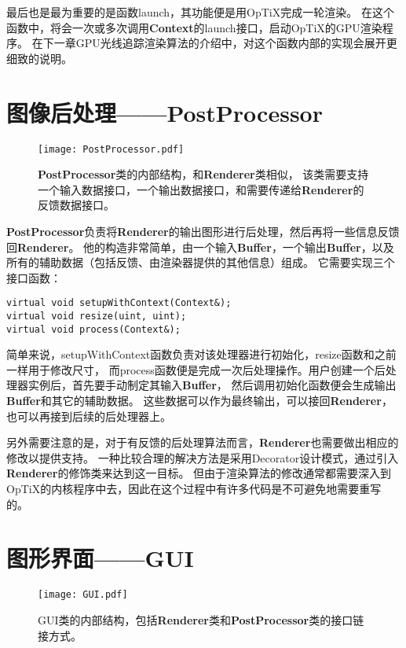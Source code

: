 最后也是最为重要的是函数launch，其功能便是用OpTiX完成一轮渲染。
在这个函数中，将会一次或多次调用\textbf{Context}的launch接口，启动OpTiX的GPU渲染程序。
在下一章GPU光线追踪渲染算法的介绍中，对这个函数内部的实现会展开更细致的说明。

\section{图像后处理——PostProcessor}

\begin{figure}[h]
    \centering
    \texttt{[image: PostProcessor.pdf]}
    \caption{\textbf{PostProcessor}类的内部结构，和\textbf{Renderer}类相似，
    该类需要支持一个输入数据接口，一个输出数据接口，和需要传递给\textbf{Renderer}的反馈数据接口。}
    \label{tab:postprocessor}
\end{figure}

\textbf{PostProcessor}负责将\textbf{Renderer}的输出图形进行后处理，然后再将一些信息反馈回\textbf{Renderer}。
他的构造非常简单，由一个输入\textbf{Buffer}，一个输出\textbf{Buffer}，以及所有的辅助数据（包括反馈、由渲染器提供的其他信息）组成。
它需要实现三个接口函数：

\lstset{language=C++}
\begin{lstlisting}
virtual void setupWithContext(Context&);
virtual void resize(uint, uint);
virtual void process(Context&);
\end{lstlisting}

简单来说，setupWithContext函数负责对该处理器进行初始化，resize函数和之前一样用于修改尺寸，
而process函数便是完成一次后处理操作。用户创建一个后处理器实例后，首先要手动制定其输入\textbf{Buffer}，
然后调用初始化函数便会生成输出\textbf{Buffer}和其它的辅助数据。
这些数据可以作为最终输出，可以接回\textbf{Renderer}，也可以再接到后续的后处理器上。

另外需要注意的是，对于有反馈的后处理算法而言，\textbf{Renderer}也需要做出相应的修改以提供支持。
一种比较合理的解决方法是采用Decorator设计模式，通过引入\textbf{Renderer}的修饰类来达到这一目标。
但由于渲染算法的修改通常都需要深入到OpTiX的内核程序中去，因此在这个过程中有许多代码是不可避免地需要重写的。

\section{图形界面——GUI}

\begin{figure}[h]
    \centering
    \texttt{[image: GUI.pdf]}
    \caption{GUI类的内部结构，包括\textbf{Renderer}类和\textbf{PostProcessor}类的接口链接方式。}
    \label{tab:gui}
\end{figure}


